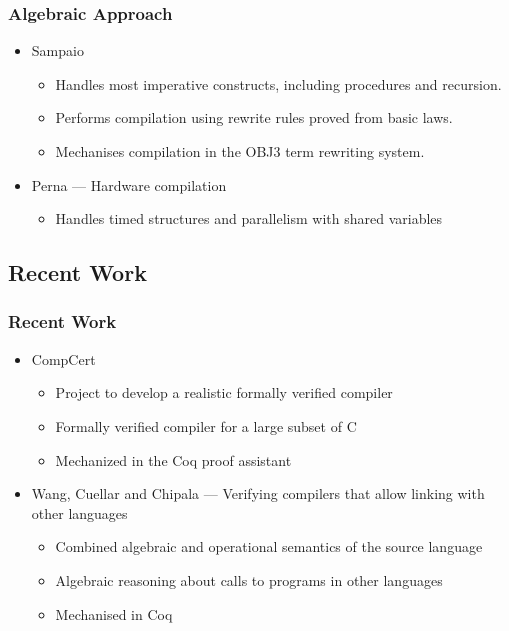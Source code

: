 \documentclass{beamer}
\newcommand{\footmake}[1]{
\ifthenelse{\equal{#1}{}}%
	{}%
	{\footnotetext{#1}}%
}
\newenvironment{slide}[2][fragile,environment=slide]
{\begin{frame}[#1]
	\frametitle{#2}\begin{refsegment}}
{\footmake{\printbibliography[segment=\therefsegment]}\end{refsegment}\end{frame}}
\begin{document}
\begin{slide}{Algebraic Approach}
  \begin{itemize}
  \item Sampaio\cite{hoare1993, sampaio1993, sampaio1997}
    \begin{itemize}
    \item Handles most imperative constructs, including procedures and recursion.
    \item Performs compilation  using rewrite rules proved from basic laws.
    \item Mechanises compilation in the OBJ3 term rewriting system\cite{goguen1988}.
    \end{itemize}
  \item Perna\cite{perna2010, perna2011} --- Hardware compilation
    \begin{itemize}
    \item Handles timed structures and parallelism with shared variables
    \end{itemize}
  \end{itemize}
\end{slide}

\subsection{Recent Work}

\begin{slide}{Recent Work}
  \begin{itemize}
  \item CompCert\cite{leroy2012}
    \begin{itemize}
    \item Project to develop a realistic formally verified compiler
    \item Formally verified compiler for a large subset of C
    \item Mechanized in the Coq proof assistant
    \end{itemize}
  \item Wang, Cuellar and Chipala\cite{wang2014} --- Verifying compilers that allow linking with other languages
    \begin{itemize}
    \item Combined algebraic and operational semantics of the source language
    \item Algebraic reasoning about calls to programs in other languages
    \item Mechanised in Coq 
    \end{itemize}
  \end{itemize}
\end{slide}
\end{document}

